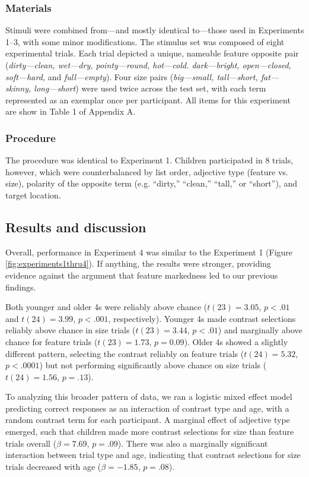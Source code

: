 \documentclass[man]{apa2}
\begin{document}
\subsubsection{Materials}

Stimuli were combined from---and mostly identical to---those used in Experiments 1--3, with some minor modifications. The stimulus set was composed of eight experimental trials.  Each trial depicted a unique, nameable feature opposite pair (\emph{dirty---clean, wet---dry, pointy---round, hot---cold. dark---bright, open---closed, soft---hard,} and \emph{full---empty}). Four size pairs (\emph{big---small, tall---short, fat---skinny, long---short}) were used twice across the test set, with each term represented as an exemplar once per participant.  All items for this experiment are show in Table 1 of Appendix A. 

\subsubsection{Procedure}

The procedure was identical to Experiment 1. Children participated in 8 trials, however, which were counterbalanced by list order, adjective type (feature vs. size), polarity of the opposite term (e.g. ``dirty,'' ``clean,'' ``tall,'' or ``short''), and target location. 

\subsection{Results and discussion}

Overall, performance in Experiment 4 was similar to the Experiment 1 (Figure \ref{fig:experiments1thru4}). If anything, the results were stronger, providing evidence against the argument that feature markedness led to our previous findings. 

Both younger and older 4s were reliably above chance ($t(23) = 3.05$, $p<.01$ and $t(24) = 3.99$, $p<.001$, respectively). Younger 4s made contrast selections reliably above chance in size trials ($t(23)=3.44$, $p<.01$) and marginally above chance for feature trials ($t(23)=1.73$, $p=0.09$). Older 4s showed a slightly different pattern, selecting the contrast reliably on feature trials ($t(24)=5.32$, $p<.0001$) but not performing significantly above chance on size trials ($t(24)=1.56$, $p=.13$). 

To analyzing this broader pattern of data, we ran a logistic mixed effect model predicting correct responses as an interaction of contrast type and age, with a random contrast term for each participant.  A marginal effect of adjective type emerged, such that children made more contrast selections for size than feature trials overall ($\beta = 7.69$, $p = .09$). There was also a marginally significant interaction between trial type and age, indicating that contrast selections for size trials decreased with age ($\beta = -1.85$, $p = .08$). 
\end{document}

